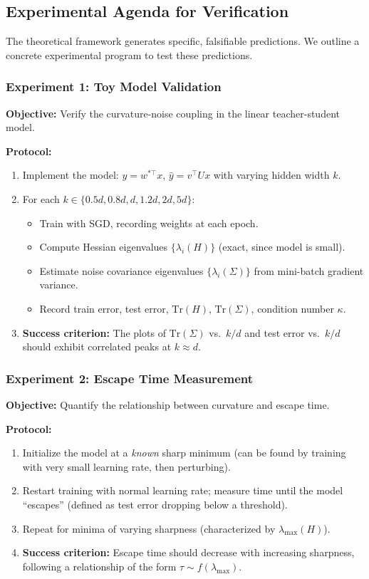 \documentclass[
  journal=largetwo,
  year=2025,
  volume=37,
]{cup-journal}
\begin{document}
\subsection{Experimental Agenda for Verification}\label{sec:experimental_agenda}

The theoretical framework generates specific, falsifiable predictions. We outline a concrete experimental program to test these predictions.

\subsubsection{Experiment 1: Toy Model Validation}

\textbf{Objective:} Verify the curvature-noise coupling in the linear teacher-student model.

\textbf{Protocol:}
\begin{enumerate}
    \item Implement the model: $y = w^{*\top} x$, $\hat{y} = v^\top U x$ with varying hidden width $k$.
    \item For each $k \in \{0.5d, 0.8d, d, 1.2d, 2d, 5d\}$:
    \begin{itemize}
        \item Train with SGD, recording weights at each epoch.
        \item Compute Hessian eigenvalues $\{\lambda_i(H)\}$ (exact, since model is small).
        \item Estimate noise covariance eigenvalues $\{\lambda_i(\Sigma)\}$ from mini-batch gradient variance.
        \item Record train error, test error, $\text{Tr}(H)$, $\text{Tr}(\Sigma)$, condition number $\kappa$.
    \end{itemize}
    \item \textbf{Success criterion:} The plots of $\text{Tr}(\Sigma)$ vs.\ $k/d$ and test error vs.\ $k/d$ should exhibit correlated peaks at $k \approx d$.
\end{enumerate}

\subsubsection{Experiment 2: Escape Time Measurement}

\textbf{Objective:} Quantify the relationship between curvature and escape time.

\textbf{Protocol:}
\begin{enumerate}
    \item Initialize the model at a \textit{known} sharp minimum (can be found by training with very small learning rate, then perturbing).
    \item Restart training with normal learning rate; measure time until the model ``escapes'' (defined as test error dropping below a threshold).
    \item Repeat for minima of varying sharpness (characterized by $\lambda_{\max}(H)$).
    \item \textbf{Success criterion:} Escape time should decrease with increasing sharpness, following a relationship of the form $\tau \sim f(\lambda_{\max})$.
\end{enumerate}
\end{document}
